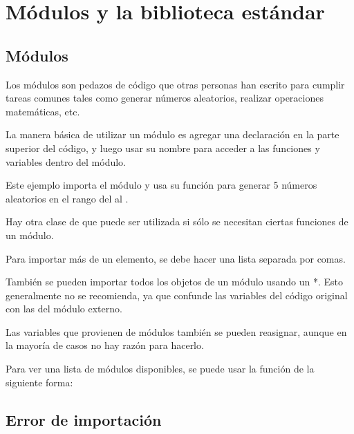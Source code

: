 \chapter{Módulos y la biblioteca estándar}

\section{Módulos}

Los módulos son pedazos de código que otras personas han escrito para cumplir tareas comunes tales como generar números aleatorios, realizar operaciones matemáticas, etc.

La manera básica de utilizar un módulo es agregar una declaración  en la parte superior del código, y luego usar su nombre para acceder a las funciones y variables dentro del módulo.


Este ejemplo importa el módulo  y usa su función  para generar 5 números aleatorios en el rango del  al .

Hay otra clase de  que puede ser utilizada si sólo se necesitan ciertas funciones de un módulo.


Para importar más de un elemento, se debe hacer una lista separada por comas.


También se pueden importar todos los objetos de un módulo usando un *.
Esto generalmente no se recomienda, ya que confunde las variables del código original con las del módulo externo.


Las variables que provienen de módulos también se pueden reasignar, aunque en la mayoría de casos no hay razón para hacerlo.


Para ver una lista de módulos disponibles, se puede usar la función  de la siguiente forma:


\section{Error de importación}

